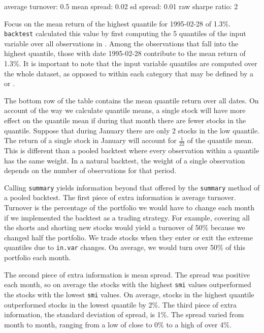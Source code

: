 \documentclass[a4paper]{report}
\begin{document}
\begin{article}
\begin{Schunk}
\begin{Soutput}
average turnover: 0.5
mean spread: 0.02
sd spread: 0.01
raw sharpe ratio: 2
\end{Soutput}
\end{Schunk}



Focus on the mean return of the highest quantile for 1995-02-28 of
1.3\%.  \texttt{backtest} calculated this value by first computing the
5 quantiles of the input variable  over all observations in
.  Among the observations that fall into the highest
quantile, those with date 1995-02-28 contribute to the mean return of
1.3\%.  It is important to note that the input variable quantiles are
computed over the whole dataset, as opposed to within each category
that may be defined by a  or .

The bottom row of the table contains the mean quantile return over all
dates.  On account of the way we calculate quantile means, a single
stock will have more effect on the quantile mean if during that month
there are fewer stocks in the quantile.  Suppose that during January
there are only 2 stocks in the low quantile.  The return of a single
stock in January will account for $\frac{1}{22}$ of the quantile mean.
This is different than a pooled backtest where every observation
within a quantile has the same weight.  In a natural backtest, the
weight of a single observation depends on the number of observations
for that period.

Calling \texttt{summary} yields information beyond that offered by the
\texttt{summary} method of a pooled backtest.  The first piece of
extra information is average turnover.  Turnover is the percentage of
the portfolio we would have to change each month if we implemented the
backtest as a trading strategy.  For example, covering all the shorts
and shorting new stocks would yield a turnover of 50\% because we
changed half the portfolio.  We trade stocks when they enter or exit
the extreme quantiles due to \texttt{in.var} changes.  On average, we
would turn over 50\% of this portfolio each month.

The second piece of extra information is mean spread.  The spread was
positive each month, so on average the stocks with the highest
\texttt{smi} values outperformed the stocks with the lowest
\texttt{smi} values.  On average, stocks in the highest quantile
outperformed stocks in the lowest quantile by 2\%.  The third piece of
extra information, the standard deviation of spread, is 1\%.  The
spread varied from month to month, ranging from a low of close to 0\%
to a high of over 4\%.


\end{article}
\end{document}
